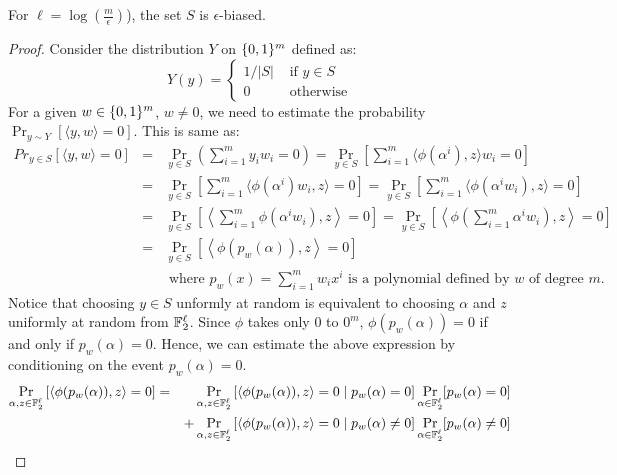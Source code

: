 \begin{lemma}
\label{lemma:epsilon-biased}
For $\ell = \log\left(\frac{m}{\epsilon}\right)$), the set $S$ is $\epsilon$-biased.
\end{lemma}
\begin{proof}
Consider the distribution $Y$ on $\{0,1\}^m$ defined as:
\[
Y(y) = \left\{
\begin{array}{ll}
1/|S| & \textrm{ if $y \in S$} \\
0 & \textrm{ otherwise}
\end{array}
\right.
\]
For a given $w \in \{0,1\}^m$, $w \ne 0$, we need to estimate the probability $\Pr_{y \sim Y} \left[ \langle y, w \rangle = 0 \right]$. This is same as:
\begin{eqnarray*}
Pr_{y \in S} \left[ \langle y, w \rangle = 0 \right] 
& = & \Pr_{y \in S} \left( \sum_{i=1}^m y_iw_i = 0 \right) 
= \Pr_{y \in S} \left[ \sum_{i=1}^m \langle \phi(\alpha^i), z \rangle w_i = 0 \right] \\
& = & \Pr_{y \in S} \left[ \sum_{i=1}^m \langle \phi(\alpha^i)w_i, z \rangle = 0 \right] 
= \Pr_{y \in S} \left[ \sum_{i=1}^m \langle \phi(\alpha^iw_i), z \rangle = 0 \right] \\
& = & \Pr_{y \in S} \left[ \left\langle \sum_{i=1}^m \phi(\alpha^iw_i), z \right\rangle = 0 \right]
= \Pr_{y \in S} \left[ \left\langle \phi \left( \sum_{i=1}^m\alpha^iw_i \right) , z \right\rangle  = 0 \right] \\
& = & \Pr_{y \in S} \left[\left\langle \phi(p_w(\alpha)), z \right\rangle  = 0 \right] \\
&& \textrm{ where $p_w(x) = \sum_{i=1}^mw_ix^i$ is a polynomial defined by $w$ of degree $m$.}
\end{eqnarray*}
Notice that choosing $y \in S$ unformly at random is equivalent to choosing $\alpha$ and $z$ uniformly at random from ${\mathbb{F}}_2^\ell$. Since $\phi$ takes only $0$ to $0^m$, $\phi(p_w(\alpha)) = 0$ if and only if $p_w(\alpha) = 0$. Hence, we can estimate the above expression by conditioning on the event $p_w(\alpha) = 0$. 
\newpage
\begin{eqnarray*}
\Pr_{\alpha, z \in {\mathbb{F}}_2^\ell} \left[\left\langle \phi(p_w(\alpha)), z \right\rangle  = 0 \right] 
& = & 
\Pr_{\alpha, z \in {\mathbb{F}}_2^\ell} \left[\left\langle \phi(p_w(\alpha)), z \right\rangle  = 0 \mid p_w(\alpha) = 0 \right] \Pr_{\alpha \in {\mathbb{F}}_2^\ell} [ p_w(\alpha) = 0 ] \\
& & + \Pr_{\alpha, z \in {\mathbb{F}}_2^\ell} \left[\left\langle \phi(p_w(\alpha)), z \right\rangle  = 0 \mid p_w(\alpha) \ne 0 \right] \Pr_{\alpha \in {\mathbb{F}}_2^\ell} [ p_w(\alpha) \ne 0 ] \\
\end{eqnarray*}


\end{proof}
